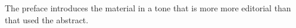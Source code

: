 \begin{preface}

The preface introduces the material in a tone that is more more
editorial than that used the abstract.

\end{preface}


